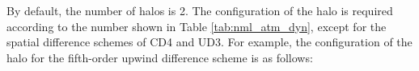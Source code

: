 By default, the number of halos is 2. The configuration of the halo is required according to the number shown in Table \ref{tab:nml_atm_dyn}, except for the spatial difference schemes of CD4 and UD3. For example, the configuration of the halo for the fifth-order upwind difference scheme is as follows:

